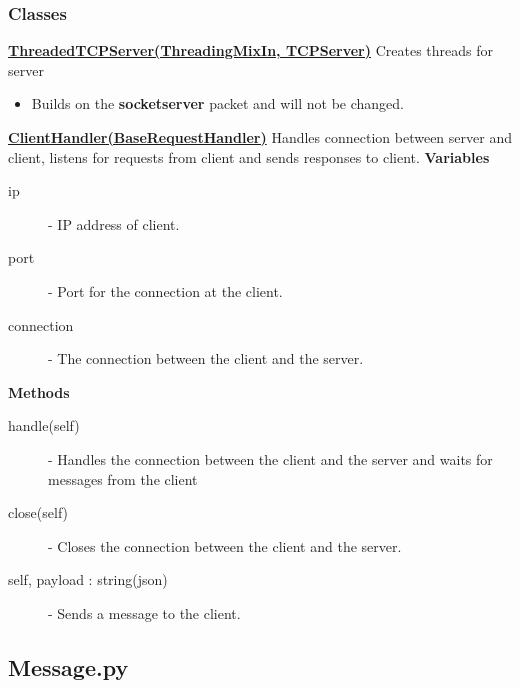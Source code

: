 \documentclass[a4paper, 12pt]{article}
\begin{document}
        \subsubsection{Classes}
            \textbf{\underline{ThreadedTCPServer(ThreadingMixIn, TCPServer)}}
            \newline
            \newline
            Creates threads for server
            \begin{itemize}
                \item Builds on the \textbf{socketserver} packet and will not be changed.
            \end{itemize}
            \textbf{\underline{ClientHandler(BaseRequestHandler)}}
            \newline
            \newline
                Handles connection between server and client, listens for requests from client and sends responses to client.
                \newline
                \newline
                \textbf{Variables}
                    \begin{description}
                        \item[ip] - IP address of client.
                        \item[port] - Port for the connection at the client.
                        \item[connection] - The connection between the client and the server.
                    \end{description}
                \textbf{Methods}
                    \begin{description}
                        \item[handle(self)] - Handles the connection between the client and the server and waits for messages from the client
                        \item[close(self)] - Closes the connection between the client and the server.
                        \item[self, payload : string(json)] - Sends a message to the client.
                    \end{description}
    \subsection{Message.py}
\end{document}
